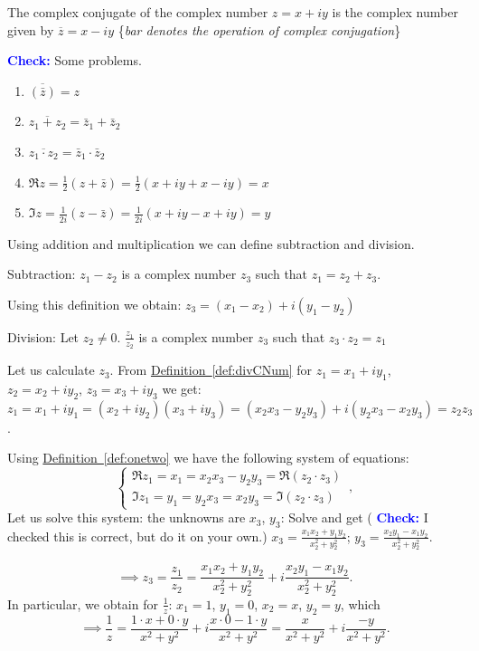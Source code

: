 \documentclass[12pt]{article}
\newcommand{\checkthis}[1]{\vspace{5pt}
\noindent\textcolor{blue}{\textbf{Check:}} #1\vspace{5pt}}
\newcommand{\HLink}[2]{\hyperref[#2]{#1~\ref*{#2}}}
\providecommand{\deflab}[1]{}
\renewcommand{\deflab}[1]{\label{def:#1}}
\newcommand{\defref}[1]{\HLink{Definition}{def:#1}}
\begin{document}
\begin{definition}
   The complex conjugate of the complex number $z=x+iy$ is the complex number given by $\overline{z}=x-iy$ \{\emph{bar denotes the operation of complex conjugation}\}
\end{definition}
\checkthis{Some problems.}
\begin{enumerate}
   \item $\overline{(\bar{z})} = z$
   \item $\overline{z_1+z_2} = \bar z_1 + \bar z_2$
   \item $\overline{z_1\cdot z_2} = \bar z_1 \cdot \bar z_2$
   \item $\Re z = \frac 12 (z+\bar z) = \frac 12 (x+iy + x-iy) = x$
   \item $\Im z = \frac{1}{2i}(z-\bar z) = \frac{1}{2i} (x+iy - x +iy) = y$
\end{enumerate}

Using addition and multiplication we can define subtraction and division.

\begin{definition}{Subtraction:}
   $z_1-z_2$ is a complex number $z_3$ such that $z_1 = z_2+z_3$.
\end{definition}

Using this definition we obtain: $z_3 = (x_1-x_2) + i(y_1-y_2)$
\begin{definition}{Division:}\deflab{divCNum}
   Let $z_2\neq 0$. $\frac{z_1}{z_2}$ is a complex number $z_3$ such that $z_3\cdot z_2 = z_1$
\end{definition}

Let us calculate $z_3$. From \defref{divCNum} for $z_1 = x_1+iy_1$, $z_2 = x_2+iy_2$, $z_3  =x_3+iy_3$ we get:
$z_1=x_1+iy_1 = (x_2+iy_2)(x_3+iy_3)=(x_2x_3-y_2y_3)+i(y_2x_3-x_2y_3)=z_2z_3$.

Using \defref{onetwo} we have the following system of equations:
\begin{equation}
   \begin{cases}
     \Re z_1 = x_1 = x_2x_3-y_2y_3 = \Re (z_2\cdot z_3) \\
     \Im z_1 = y_1 = y_2x_3 = x_2y_3 = \Im (z_2\cdot z_3)
   \end{cases}\,,
\end{equation}
Let us solve this system: the unknowns are $x_3$, $y_3$:
Solve and get (\checkthis{I checked this is correct, but do it on your own.}) $x_3 = \frac{x_1x_2+y_1y_2}{x_2^2 + y_2^2}$; $y_3 = \frac{x_2y_1-x_1y_2}{x_2^2+y_2^2}$.

\[\implies z_3 = \frac{z_1}{z_2} = \frac{x_1x_2+y_1y_2}{x_2^2 + y_2^2} + i\frac{x_2y_1-x_1y_2}{x_2^2+y_2^2}.\]
In particular, we obtain for $\frac 1z$: $x_1 = 1$, $y_1 = 0$, $x_2 = x$, $y_2=y$, which \[\implies \frac 1z = \frac{1\cdot x+0\cdot y}{x^2+y^2}+i\frac{x\cdot 0-1\cdot y}{x^2+y^2} = \frac x{x^2+y^2}+i\frac{-y}{x^2+y^2}.\]
\end{document}
